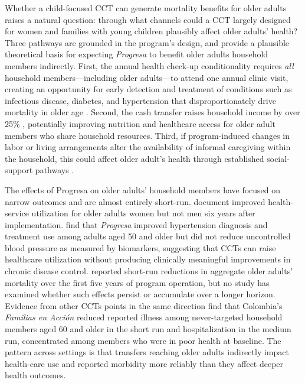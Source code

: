 \documentclass[12pt]{article}
\begin{document}
\p Whether a child-focused CCT can generate mortality benefits for older adults raises a natural question: through what channels could a CCT largely designed for women and families with young children plausibly affect older adults' health? Three pathways are grounded in the program's design, and provide a plausible theoretical basis for expecting \textit{Progresa} to benefit older adults household members indirectly. First, the annual health check-up conditionality requires \textit{all} household members—including older adults—to attend one annual clinic visit, creating an opportunity for early detection and treatment of conditions such as infectious disease, diabetes, and hypertension that disproportionately drive mortality in older age \citep{Angel2017Gerontologist, aguila2024conditional}. Second, the cash transfer raises household income by over 25\% \citep{Gertler2004AER, ParkerTodd2017JEL}, potentially improving nutrition and healthcare access for older adult members who share household resources. Third, if program-induced changes in labor or living arrangements alter the availability of informal caregiving within the household, this could affect older adult's health through established social-support pathways \citep{duflo2000child, BehrmanParker2013Demography}. 

\p The effects of Progresa on older adults' household members have focused on narrow outcomes and are almost entirely short-run. \cite{BehrmanParker2013Demography} document improved health-service utilization for older adults women but not men six years after implementation. \cite{aguila2024conditional} find that \textit{Progresa} improved hypertension diagnosis and treatment use among adults aged 50 and older but did not reduce uncontrolled blood pressure as measured by biomarkers, suggesting that CCTs can raise healthcare utilization without producing clinically meaningful improvements in chronic disease control. \cite{BarhamRowberry2013JDE} reported short-run reductions in aggregate older adults' mortality over the first five years of program operation, but no study has examined whether such effects persist or accumulate over a longer horizon. Evidence from other CCTs points in the same direction \cite{ContrerasSuarezMaitra2021JPopEcon} find that Colombia's \textit{Familias en Acci\'on} reduced reported illness among never-targeted household members aged 60 and older in the short run and hospitalization in the medium run, concentrated among members who were in poor health at baseline. The pattern across settings is that transfers reaching older adults indirectly impact health-care use and reported morbidity more reliably than they affect deeper health outcomes.
\end{document}
